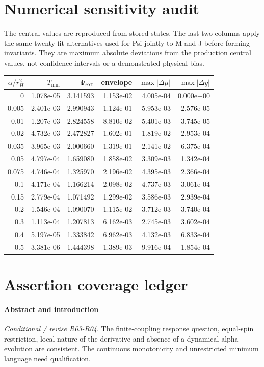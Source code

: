 \documentclass[10pt,a4paper]{article}
\begin{document}
\section{Numerical sensitivity audit}
The central values are reproduced from stored states. The last two columns apply the same twenty fit alternatives used for Psi jointly to M and J before forming invariants. They are maximum absolute deviations from the production central values, not confidence intervals or a demonstrated physical bias.
\begin{longtable}{rrrrrr}\toprule $\alpha/r_H^2$ & $T_{\min}$ & $\Psi_{\rm ext}$ & envelope & $\max|\Delta\mu|$ & $\max|\Delta y|$\\\midrule\endhead
0 & 1.078e-05 & 3.141593 & 1.153e-02 & 4.005e-04 & 0.000e+00\\
0.005 & 2.401e-03 & 2.990943 & 1.124e-01 & 5.953e-03 & 2.576e-05\\
0.01 & 1.207e-03 & 2.824558 & 8.810e-02 & 5.401e-03 & 3.745e-05\\
0.02 & 4.732e-03 & 2.472827 & 1.602e-01 & 1.819e-02 & 2.953e-04\\
0.035 & 3.965e-03 & 2.000660 & 1.319e-01 & 2.141e-02 & 6.375e-04\\
0.05 & 4.797e-04 & 1.659080 & 1.858e-02 & 3.309e-03 & 1.342e-04\\
0.075 & 4.746e-04 & 1.325970 & 2.196e-02 & 4.395e-03 & 2.366e-04\\
0.1 & 4.171e-04 & 1.166214 & 2.098e-02 & 4.737e-03 & 3.061e-04\\
0.15 & 2.779e-04 & 1.071492 & 1.299e-02 & 3.586e-03 & 2.939e-04\\
0.2 & 1.546e-04 & 1.090070 & 1.115e-02 & 3.712e-03 & 3.740e-04\\
0.3 & 1.113e-04 & 1.207813 & 6.162e-03 & 2.745e-03 & 3.602e-04\\
0.4 & 5.197e-05 & 1.333842 & 6.962e-03 & 4.132e-03 & 6.833e-04\\
0.5 & 3.381e-06 & 1.444398 & 1.389e-03 & 9.916e-04 & 1.854e-04\\
\bottomrule\end{longtable}
\section{Assertion coverage ledger}
\paragraph{Abstract and introduction} \textit{Conditional / revise R03-R04}. The finite-coupling response question, equal-spin restriction, local nature of the derivative and absence of a dynamical alpha evolution are consistent. The continuous monotonicity and unrestricted minimum language need qualification.
\end{document}
